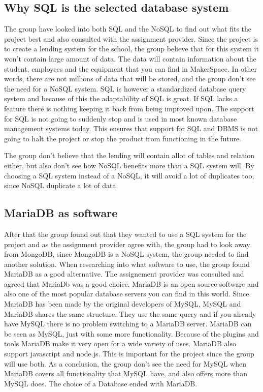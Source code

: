 \subsection{Why SQL is the selected database system}
The group have looked into both SQL and the NoSQL to find out what fits the project best and also consulted with the assignment provider. Since the project is to create a lending system for the school, the group believe that for this system it won’t contain large amount of data. The data will contain information about the student, employees and the equipment that you can find in MakerSpace. In other words, there are not millions of data that will be stored, and the group don’t see the need for a NoSQL system. SQL is however a standardized database query system and because of this the adaptability of SQL is great\cite{structured-query-language}. If SQL lacks a feature there is nothing keeping it back from being improved upon. The support for SQL is not going to suddenly stop and is used in most known database management systems today. This ensures that support for SQL and DBMS is not going to halt the project or stop the product from functioning in the future.  

The group don’t believe that the lending will contain allot of tables and relation either, but also don’t see how NoSQL benefits more than a SQL system will. By choosing a SQL system instead of a NoSQL, it will avoid a lot of duplicates too, since NoSQL duplicate a lot of data.

\subsection{MariaDB as software}
After that the group found out that they wanted to use a SQL system for the project and as the assignment provider 
agree with, the group had to look away from MongoDB, since MongoDB is a NoSQL system, the group needed to find another solution. When researching into what software to use, the group found MariaDB as a good alternative. The assignement provider was consulted and agreed that MariaDb was a good choice. MariaDB is an open source software and also one of the most popular database servers you can find in this world. Since MariaDB has been made by the original developers of MySQL, MySQL and MariaDB shares the same structure. They use the same query and if you already have MySQL there is no problem switching to a MariaDB server. MariaDB can be seen as MySQL, just with some more functionality. Because of the plugins and tools MariaDB make it very open for a wide variety of uses. MariaDB also support javascript and node.js. This is important for the project since the group will use both. As a conclusion, the group don't see the need for MySQL when MariaDB covers all functionality that MySQL have, and also offers more than MySQL does. The choice of a Database ended with MariaDB.\cite{mariadb_1}\cite{mariadb_2}

